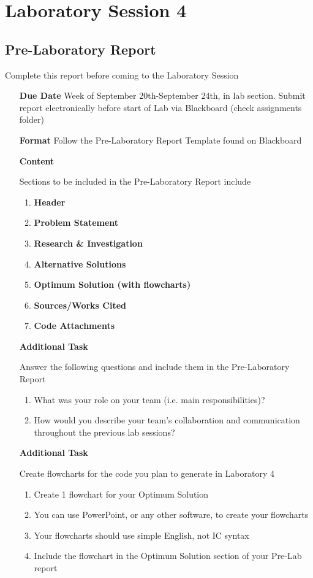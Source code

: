 \chapter{Laboratory Session 4}
\section{Pre-Laboratory Report}
	Complete this report before coming to the Laboratory Session
\begin{itemize}
	\item[\textbf{Due Date}]{Week of September 20th-September 24th, \the\year \space in lab section. Submit report electronically before start of Lab via Blackboard (check assignments folder)}
	\item[\textbf{Format}]{Follow the Pre-Laboratory Report Template found on Blackboard}
	\item[\textbf{Content}]{Sections to be included in the Pre-Laboratory Report include
		\begin{enumerate}
			\item \textbf{Header}
			\item \textbf{Problem Statement}
			\item \textbf{Research \& Investigation}
			\item \textbf{Alternative Solutions}
			\item \textbf{Optimum Solution (with flowcharts)}
			\item \textbf{Sources/Works Cited}
			\item \textbf{Code Attachments}
		\end{enumerate}
		
	}
	\item[\textbf{Additional Task}]{Answer the following questions and include them in the Pre-Laboratory Report
		\begin{enumerate}[label=\alph*.]
			\item What was your role on your team (i.e. main responsibilities)? 
			\item How would you describe your team’s collaboration and communication throughout the previous lab sessions? 
		\end{enumerate}	
	}
	
	\item[\textbf{Additional Task}]{Create flowcharts for the code you plan to generate in Laboratory 4
		\begin{enumerate}[label=\alph*.]
			\item Create 1 flowchart for your Optimum Solution
			\item You can use PowerPoint, or any other software, to create your flowcharts
			\item Your flowcharts should use simple English, not IC syntax
			\item Include the flowchart in the Optimum Solution section of your Pre-Lab report
		\end{enumerate}
		
	}
\end{itemize}
